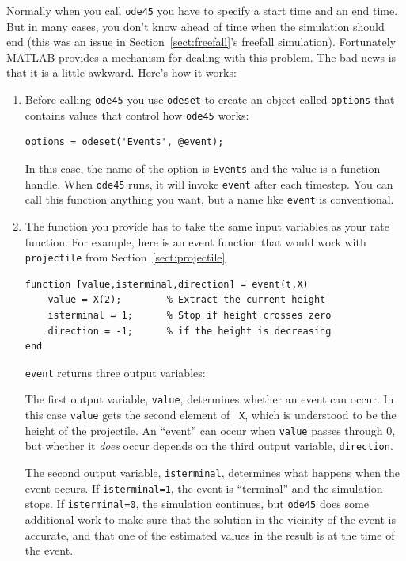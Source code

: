 \documentclass[
]{book}
\begin{document}
Normally when you call {\tt ode45} you have to specify a start time and
an end time.  But in many cases, you don't know ahead of time when the
simulation should end (this was an issue in Section~\ref{sect:freefall}'s
freefall simulation). Fortunately MATLAB provides a mechanism for
dealing with this problem.  The bad news is that it is a little awkward.
Here's how it works:

\begin{enumerate}

\item Before calling {\tt ode45} you use {\tt odeset} to create an
object called {\tt options} that contains values that control
how {\tt ode45} works:

\begin{verbatim}
options = odeset('Events', @event);
\end{verbatim}
%
In this case, the name of the option is {\tt Events} and the
value is a function handle.  When {\tt ode45} runs, it will invoke
{\tt event} after each timestep.
You can call this function anything you want, but a name
like {\tt event} is conventional.

\item The function you provide has to take
the same input variables as your rate function.  For example,
here is an event function that would work with {\tt projectile}
from Section~\ref{sect:projectile}

\begin{verbatim}
function [value,isterminal,direction] = event(t,X)
    value = X(2);        % Extract the current height
    isterminal = 1;      % Stop if height crosses zero
    direction = -1;      % if the height is decreasing
end
\end{verbatim}

{\tt event} returns three output variables:

The  first output variable, {\tt value}, determines whether an event can
        occur.  In this case {\tt value} gets the second element of {\tt
        X}, which is understood to be the height of the projectile.  An
        ``event'' can occur when {\tt value} passes through 0, but
        whether it \textit{does} occur depends on the third output
        variable, {\tt direction}.

The second output variable, {\tt isterminal}, determines what happens
        when the event occurs.  If {\tt isterminal=1}, the event is
        ``terminal'' and the simulation stops.  If {\tt isterminal=0},
        the simulation continues, but {\tt ode45} does some additional
        work to make sure that the solution in the vicinity of the event
        is accurate, and that one of the estimated values in the result
        is at the time of the event.


\end{enumerate}
\end{document}
